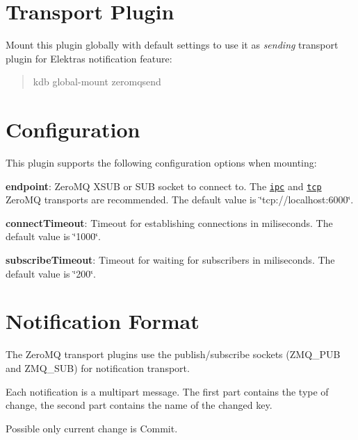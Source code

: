 \section*{Transport Plugin}

Mount this plugin globally with default settings to use it as {\itshape sending} transport plugin for Elektra\textquotesingle{}s notification feature\+:

\begin{quote}
kdb global-\/mount zeromqsend \end{quote}


\section*{Configuration}

This plugin supports the following configuration options when mounting\+:


\begin{DoxyItemize}
\item {\bfseries endpoint}\+: Zero\+MQ X\+S\+UB or S\+UB socket to connect to. The \href{http://api.zeromq.org/4-2:zmq-ipc}{\tt {\ttfamily ipc}} and \href{http://api.zeromq.org/4-2:zmq-tcp}{\tt {\ttfamily tcp}} Zero\+MQ transports are recommended. The default value is \char`\"{}tcp\+://localhost\+:6000\char`\"{}.
\item {\bfseries connect\+Timeout}\+: Timeout for establishing connections in miliseconds. The default value is \char`\"{}1000\char`\"{}.
\item {\bfseries subscribe\+Timeout}\+: Timeout for waiting for subscribers in miliseconds. The default value is \char`\"{}200\char`\"{}.
\end{DoxyItemize}

\section*{Notification Format}

The Zero\+MQ transport plugins use the publish/subscribe sockets ({\ttfamily Z\+M\+Q\+\_\+\+P\+UB} and {\ttfamily Z\+M\+Q\+\_\+\+S\+UB}) for notification transport.

Each notification is a multipart message. The first part contains the type of change, the second part contains the name of the changed key.

Possible only current change is {\ttfamily Commit}. 